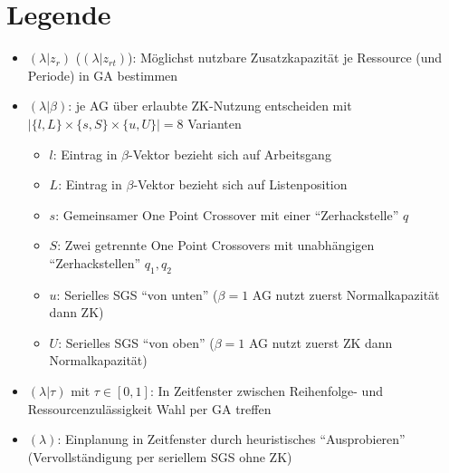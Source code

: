 \documentclass{scrartcl}
\begin{document}
\section{Legende}
\begin{itemize}
\item $(\lambda|z_r)$ ($(\lambda|z_{rt})$): Möglichst nutzbare Zusatzkapazität je Ressource (und Periode) in GA bestimmen
\item $(\lambda|\beta)$: je AG über erlaubte ZK-Nutzung entscheiden mit $|\{l,L\} \times \{s, S\} \times \{u, U\}|=8$ Varianten
	\begin{itemize}
	\item $l$: Eintrag in $\beta$-Vektor bezieht sich auf Arbeitsgang
	\item $L$: Eintrag in $\beta$-Vektor bezieht sich auf Listenposition
	\item $s$: Gemeinsamer One Point Crossover mit einer ``Zerhackstelle'' $q$
	\item $S$: Zwei getrennte One Point Crossovers mit unabhängigen ``Zerhackstellen'' $q_1, q_2$
	\item $u$: Serielles SGS ``von unten'' ($\beta=1$ AG nutzt zuerst Normalkapazität dann ZK)
	\item $U$: Serielles SGS ``von oben'' ($\beta=1$ AG nutzt zuerst ZK dann Normalkapazität)
	\end{itemize}
\item $(\lambda|\tau)$ mit $\tau \in [0,1]$: In Zeitfenster zwischen Reihenfolge- und Ressourcenzulässigkeit Wahl per GA treffen
\item $(\lambda)$: Einplanung in Zeitfenster durch heuristisches ``Ausprobieren'' (Vervollständigung per seriellem SGS ohne ZK)
\end{itemize}
\end{document}
